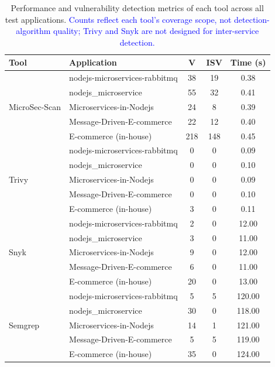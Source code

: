 \documentclass[preprint,12pt]{elsarticle}
\newcommand{\new}[1]{\textcolor{blue}{#1}}
\newcommand{\safefixtablestyle}{%
  \small
  \setlength{\tabcolsep}{5pt}
  \renewcommand{\arraystretch}{1.15}
}
\begin{document}
\begin{table}[!t]
\centering
\caption{Performance and vulnerability detection metrics of each tool across all test applications. \new{Counts reflect each tool's coverage scope, not detection-algorithm quality; Trivy and Snyk are not designed for inter-service detection.}}
\label{tab:results_by_tool}
\safefixtablestyle
\begin{tabular}{@{} l p{4.5cm} c c c @{}}
\toprule
\textbf{Tool} & \textbf{Application} & \textbf{V} & \textbf{ISV} & \textbf{Time (s)} \\
\midrule
\multirow{5}{*}{MicroSec-Scan} 
 & nodejs-microservices-rabbitmq & 38 & 19 & 0.38 \\
 & nodejs\_microservice & 55 & 32 & 0.41 \\
 & Microservices-in-Nodejs & 24 & 8 & 0.39 \\
 & Message-Driven-E-commerce & 22 & 12 & 0.40 \\
 & E-commerce (in-house) & 218 & 148 & 0.45 \\
\midrule
\multirow{5}{*}{Trivy} 
 & nodejs-microservices-rabbitmq & 0 & 0 & 0.09 \\
 & nodejs\_microservice & 0 & 0 & 0.10 \\
 & Microservices-in-Nodejs & 0 & 0 & 0.09 \\
 & Message-Driven-E-commerce & 0 & 0 & 0.10 \\
 & E-commerce (in-house) & 3 & 0 & 0.11 \\
\midrule
\multirow{5}{*}{Snyk} 
 & nodejs-microservices-rabbitmq & 2 & 0 & 12.00 \\
 & nodejs\_microservice & 3 & 0 & 11.00 \\
 & Microservices-in-Nodejs & 9 & 0 & 12.00 \\
 & Message-Driven-E-commerce & 6 & 0 & 11.00 \\
 & E-commerce (in-house) & 20 & 0 & 13.00 \\
\midrule
\multirow{5}{*}{Semgrep} 
 & nodejs-microservices-rabbitmq & 5 & 5 & 120.00 \\
 & nodejs\_microservice & 30 & 0 & 118.00 \\
 & Microservices-in-Nodejs & 14 & 1 & 121.00 \\
 & Message-Driven-E-commerce & 5 & 5 & 119.00 \\
 & E-commerce (in-house) & 35 & 0 & 124.00 \\
\bottomrule
\end{tabular}
\end{table}
\end{document}
